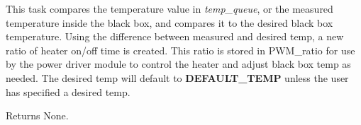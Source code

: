 This task compares the temperature value in {\itshape temp\+\_\+queue}, or the measured temperature inside the black box, and compares it to the desired black box temperature. Using the difference between measured and desired temp, a new ratio of heater on/off time is created. This ratio is stored in P\+W\+M\+\_\+ratio for use by the power driver module to control the heater and adjust black box temp as needed. The desired temp will default to {\bfseries D\+E\+F\+A\+U\+L\+T\+\_\+\+T\+E\+MP} unless the user has specified a desired temp.

\begin{DoxyReturn}{Returns}
None. 
\end{DoxyReturn}
